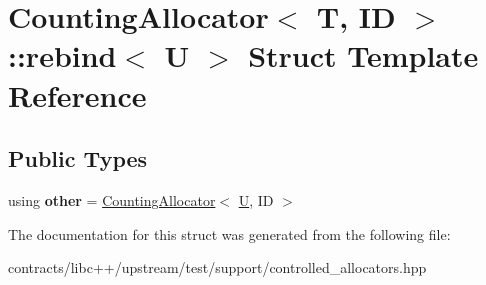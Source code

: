 \hypertarget{struct_counting_allocator_1_1rebind}{}\section{Counting\+Allocator$<$ T, ID $>$\+:\+:rebind$<$ U $>$ Struct Template Reference}
\label{struct_counting_allocator_1_1rebind}
\subsection*{Public Types}
\begin{DoxyCompactItemize}
\item 
\mbox{\label{struct_counting_allocator_1_1rebind_aea1b7d436e596bb4e081adbf6b035827}} 
using {\bfseries other} = \mbox{\hyperlink{class_counting_allocator}{Counting\+Allocator}}$<$ \mbox{\hyperlink{union_u}{U}}, ID $>$
\end{DoxyCompactItemize}


The documentation for this struct was generated from the following file\+:\begin{DoxyCompactItemize}
\item 
contracts/libc++/upstream/test/support/controlled\+\_\+allocators.\+hpp\end{DoxyCompactItemize}
